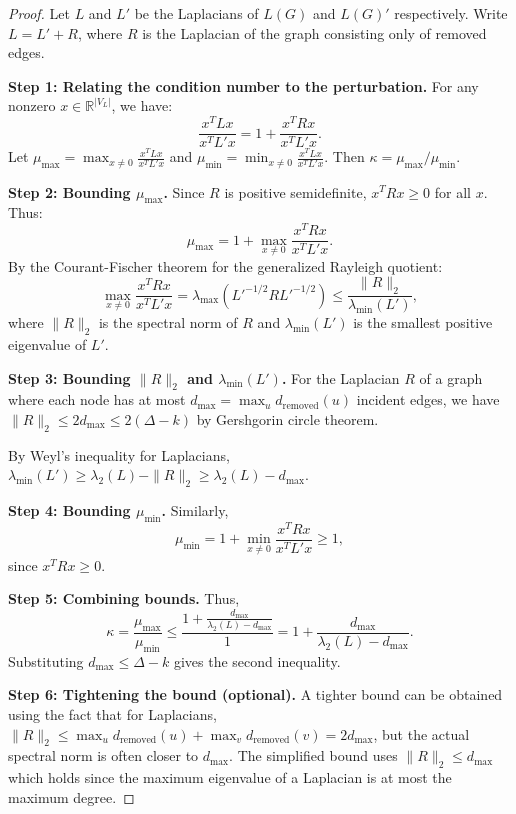 \documentclass[pdflatex,sn-mathphys-num]{sn-jnl}%
\theoremstyle{thmstyleone}%
\theoremstyle{thmstyletwo}%
\theoremstyle{thmstylethree}%
\theoremstyle{plain} %
\theoremstyle{definition} %
\theoremstyle{remark} %
\theoremstyle{plain} %
\begin{document}
\begin{proof}
Let $L$ and $L'$ be the Laplacians of $L(G)$ and $L(G)'$ respectively. Write $L = L' + R$, where $R$ is the Laplacian of the graph consisting only of removed edges.

\textbf{Step 1: Relating the condition number to the perturbation.}
For any nonzero $x \in \mathbb{R}^{|V_L|}$, we have:
\[
\frac{x^T L x}{x^T L' x} = 1 + \frac{x^T R x}{x^T L' x}.
\]
Let $\mu_{\max} = \max_{x \neq 0} \frac{x^T L x}{x^T L' x}$ and $\mu_{\min} = \min_{x \neq 0} \frac{x^T L x}{x^T L' x}$. Then $\kappa = \mu_{\max} / \mu_{\min}$.

\textbf{Step 2: Bounding $\mu_{\max}$.}
Since $R$ is positive semidefinite, $x^T R x \geq 0$ for all $x$. Thus:
\[
\mu_{\max} = 1 + \max_{x \neq 0} \frac{x^T R x}{x^T L' x}.
\]
By the Courant-Fischer theorem for the generalized Rayleigh quotient:
\[
\max_{x \neq 0} \frac{x^T R x}{x^T L' x} = \lambda_{\max}(L'^{-1/2} R L'^{-1/2}) \leq \frac{\|R\|_2}{\lambda_{\min}(L')},
\]
where $\|R\|_2$ is the spectral norm of $R$ and $\lambda_{\min}(L')$ is the smallest positive eigenvalue of $L'$.

\textbf{Step 3: Bounding $\|R\|_2$ and $\lambda_{\min}(L')$.}
For the Laplacian $R$ of a graph where each node has at most $d_{\max} = \max_u d_{\text{removed}}(u)$ incident edges, we have $\|R\|_2 \leq 2d_{\max} \leq 2(\Delta - k)$ by Gershgorin circle theorem.

By Weyl's inequality for Laplacians, $\lambda_{\min}(L') \geq \lambda_2(L) - \|R\|_2 \geq \lambda_2(L) - d_{\max}$.

\textbf{Step 4: Bounding $\mu_{\min}$.}
Similarly,
\[
\mu_{\min} = 1 + \min_{x \neq 0} \frac{x^T R x}{x^T L' x} \geq 1,
\]
since $x^T R x \geq 0$.

\textbf{Step 5: Combining bounds.}
Thus,
\[
\kappa = \frac{\mu_{\max}}{\mu_{\min}} \leq \frac{1 + \frac{d_{\max}}{\lambda_2(L) - d_{\max}}}{1} = 1 + \frac{d_{\max}}{\lambda_2(L) - d_{\max}}.
\]
Substituting $d_{\max} \leq \Delta - k$ gives the second inequality.

\textbf{Step 6: Tightening the bound (optional).}
A tighter bound can be obtained using the fact that for Laplacians, $\|R\|_2 \leq \max_u d_{\text{removed}}(u) + \max_v d_{\text{removed}}(v) = 2d_{\max}$, but the actual spectral norm is often closer to $d_{\max}$. The simplified bound uses $\|R\|_2 \leq d_{\max}$ which holds since the maximum eigenvalue of a Laplacian is at most the maximum degree.
\end{proof}
\end{document}
